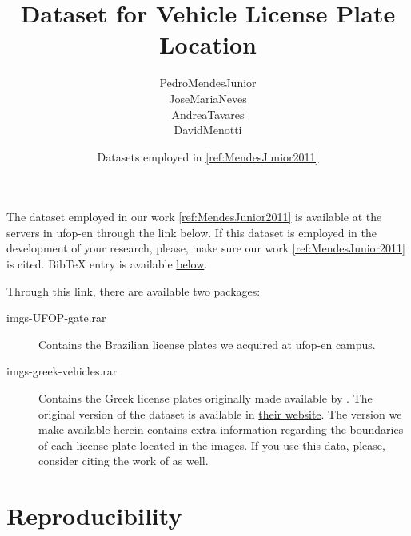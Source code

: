 

% 

\title{Dataset for Vehicle License Plate Location}
\author{\gls{PedroMendesJunior}\\%
  \gls{JoseMariaNeves}\\%
  \gls{AndreaTavares}\\%
  \gls{DavidMenotti}\\%
}
\date{Datasets employed in \ref{ref:MendesJunior2011}}




\maketitle

The dataset employed in our work \ref{ref:MendesJunior2011} is available at the servers in \gls{ufop-en} through the link below.
If this dataset is employed in the development of your research, please, make sure our work \ref{ref:MendesJunior2011} is cited.
BibTeX entry is available \hyperref[ref:MendesJunior2011]{below}.

\begin{center}
\end{center}

Through this link, there are available two packages:

\begin{description}
\item[imgs-UFOP-gate.rar]
  Contains the Brazilian license plates we acquired at \gls{ufop-en} campus.
\item[imgs-greek-vehicles.rar]
  Contains the Greek license plates originally made available by .
  The original version of the dataset is available in \href{http://www.medialab.ntua.gr/research/LPRdatabase.html}{their website}.
  The version we make available herein contains extra information regarding the boundaries of each license plate located in the images.
  If you use this data, please, consider citing the work of  as well.
\end{description}

\section*{Reproducibility}
\label{sec:reproducibility}

